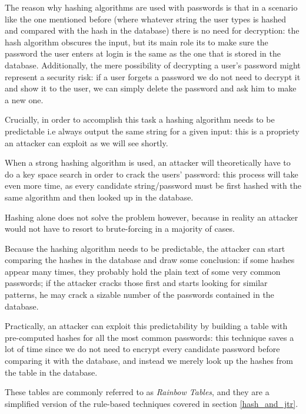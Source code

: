 The reason why hashing algorithms are used with passwords is that in a scenario like the one mentioned before (where whatever string the user types is hashed and compared with the hash in the database) there is no need for decryption: the hash algorithm obscures the input, but its main role its to make sure the password the user enters at login is the same as the one that is stored in the database.
Additionally, the mere possibility of decrypting a user's password might represent a security risk: if a user forgets a password we do not need to  decrypt it and show it to the user, we can simply delete the password and ask him to make a new one. 

Crucially, in order to accomplish this task a hashing algorithm needs to be predictable i.e always output the same string for a given input: this is a propriety an attacker can exploit as we will see shortly. 

When a strong hashing algorithm is used, an attacker will theoretically have to do a key space search in order to crack the users' password: this process will take even more time, as every candidate string/password must be first hashed with the same algorithm and then looked up in the database.

Hashing alone does not solve the problem however, because in reality an attacker would not have to resort to brute-forcing in a majority of cases.

Because the hashing algorithm needs to be predictable, the attacker can start comparing the hashes in the database and draw some conclusion: if some hashes appear many times, they probably hold the plain text of some very common passwords; if the attacker cracks those first and starts looking for similar patterns, he may crack a sizable number of the passwords contained in the database.

Practically, an attacker can exploit this predictability by building a table with pre-computed hashes for all the most common passwords: this technique saves a lot of time since we do not need to encrypt every candidate password before comparing it with the database, and instead we merely look up the hashes from the table in the database. 

These tables are commonly referred to as \emph{Rainbow Tables}, and they are a simplified version of the rule-based techniques covered in section \ref{hash_and_jtr}.

